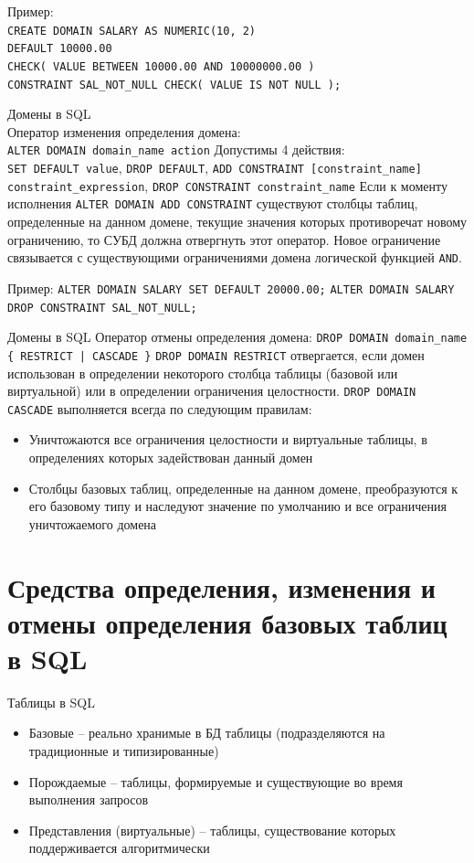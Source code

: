 \documentclass[a4paper,12pt]{article}
\begin{document}
Пример:  \\
\texttt{CREATE DOMAIN SALARY AS NUMERIC(10, 2) \\
DEFAULT 10000.00 \\
CHECK( VALUE BETWEEN 10000.00 AND 10000000.00 ) \\
CONSTRAINT SAL\_NOT\_NULL CHECK( VALUE IS NOT NULL );}

Домены в SQL  \\
Оператор изменения определения домена:  \\
\texttt{ALTER DOMAIN domain\_name action}  
Допустимы 4 действия:  \\
\texttt{SET DEFAULT value}, \texttt{DROP DEFAULT}, \texttt{ADD CONSTRAINT [constraint\_name] constraint\_expression}, \texttt{DROP CONSTRAINT constraint\_name}  
Если к моменту исполнения \texttt{ALTER DOMAIN ADD CONSTRAINT} существуют столбцы таблиц, определенные на данном домене, текущие значения которых противоречат новому ограничению, то СУБД должна отвергнуть этот оператор.  
Новое ограничение связывается с существующими ограничениями домена логической функцией \texttt{AND}.

Пример:  
\texttt{ALTER DOMAIN SALARY SET DEFAULT 20000.00;}  
\texttt{ALTER DOMAIN SALARY DROP CONSTRAINT SAL\_NOT\_NULL;}

Домены в SQL  
Оператор отмены определения домена:  
\texttt{DROP DOMAIN domain\_name \{ RESTRICT | CASCADE \}}  
\texttt{DROP DOMAIN RESTRICT} отвергается, если домен использован в определении некоторого столбца таблицы (базовой или виртуальной) или в определении ограничения целостности.  
\texttt{DROP DOMAIN CASCADE} выполняется всегда по следующим правилам:
\begin{itemize}
    \item Уничтожаются все ограничения целостности и виртуальные таблицы, в определениях которых задействован данный домен
    \item Столбцы базовых таблиц, определенные на данном домене, преобразуются к его базовому типу и наследуют значение по умолчанию и все ограничения уничтожаемого домена
\end{itemize}

\section{Средства определения, изменения и отмены определения базовых таблиц в SQL}

Таблицы в SQL  
\begin{itemize}
    \item Базовые – реально хранимые в БД таблицы (подразделяются на традиционные и типизированные)
    \item Порождаемые – таблицы, формируемые и существующие во время выполнения запросов
    \item Представления (виртуальные) – таблицы, существование которых поддерживается алгоритмически
\end{itemize}
\end{document}
